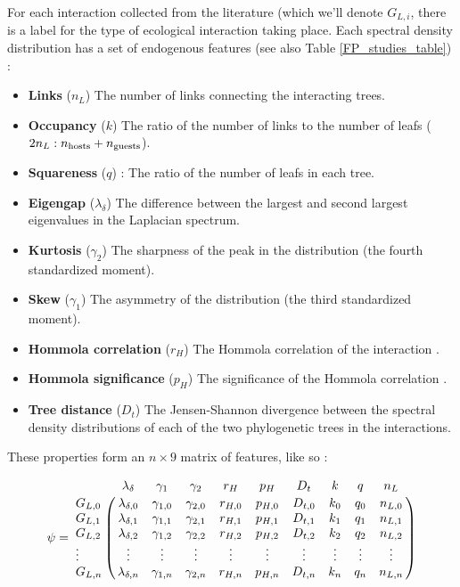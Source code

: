 For each interaction collected from the literature (which we'll denote $G_{L,i}$, there is a label for the type of ecological interaction taking place. Each spectral density distribution has a set of endogenous features (see also Table \ref{FP_studies_table}) :

\begin{itemize}
    \item{\textbf{Links} ($n_{L}$)} The number of links connecting the interacting trees.

    \item{\textbf{Occupancy} ($k$)} The ratio of the number of links to the number of leafs ($2 n_{L} : n_{\rm hosts} + n_{\rm guests}$).

    \item{\textbf{Squareness} ($q$)} : The ratio of the number of leafs in each tree.

    \item{\textbf{Eigengap} ($\lambda_{\delta}$)} The difference between the largest and second largest eigenvalues in the Laplacian spectrum.
    
    \item{\textbf{Kurtosis} ($\gamma_{2}$)} The sharpness of the peak in the distribution (the fourth standardized moment).

    \item{\textbf{Skew} ($\gamma_{1}$)} The asymmetry of the distribution (the third standardized moment).

    \item{\textbf{Hommola correlation} ($r_{H}$)} The Hommola correlation of the interaction \cite{hommola2009permutation}.

    \item{\textbf{Hommola significance} ($p_{H}$)} The significance of the Hommola correlation \cite{hommola2009permutation}.

    \item{\textbf{Tree distance} ($D_{t}$)} The Jensen-Shannon divergence between the spectral density distributions of each of the two phylogenetic trees in the interactions.
\end{itemize}

\noindent These properties form an $n\times 9$ matrix of features, like so :

\begin{equation}
\psi =
\bordermatrix{
        & \lambda_{\delta}   & \gamma_{1}   & \gamma_{2}   & r_{H}   & p_{H}   & D_{t}   & k      & q      & n_{L}   \cr
G_{L,0} & \lambda_{\delta,0} & \gamma_{1,0} & \gamma_{2,0} & r_{H,0} & p_{H,0} & D_{t,0} & k_{0}  & q_{0}  & n_{L,0} \cr
G_{L,1} & \lambda_{\delta,1} & \gamma_{1,1} & \gamma_{2,1} & r_{H,1} & p_{H,1} & D_{t,1} & k_{1}  & q_{1}  & n_{L,1} \cr
G_{L,2} & \lambda_{\delta,2} & \gamma_{1,2} & \gamma_{2,2} & r_{H,2} & p_{H,2} & D_{t,2} & k_{2}  & q_{2}  & n_{L,2} \cr
\vdots  & \vdots             & \vdots       & \vdots       & \vdots  & \vdots  & \vdots  & \vdots & \vdots & \vdots  \cr 
G_{L,n} & \lambda_{\delta,n} & \gamma_{1,n} & \gamma_{2,n} & r_{H,n} & p_{H,n} & D_{t,n} & k_{n}  & q_{n}  & n_{L,n} \cr
}
\end{equation}

